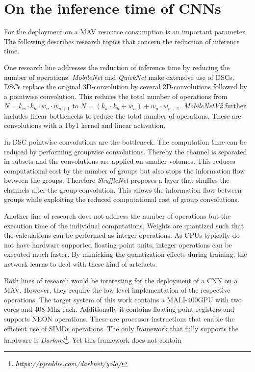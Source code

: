 \section{On the inference time of \acp{CNN}}

For the deployment on a \ac{MAV} resource consumption is an important parameter. The following describes research topics that concern the reduction of inference time.

One research line addresses the reduction of inference time by reducing the number of operations. \textit{MobileNet} \cite{Howard2017} and \textit{QuickNet} \cite{Ghosh2017} make extensive use of \acp{DSC}. \acp{DSC} replace the original 3D-convolution by several 2D-convolutions followed by a pointwise convolution. This reduces the total number of operations from $N = k_w \cdot k_h \cdot w_n \cdot w_{n+1}$ to $N=(k_w \cdot k_h + w_n)+w_n \cdot w_{n+1}$. \textit{MobileNetV2} \cite{Sandler2018} further includes linear bottlenecks to reduce the total number of operations. These are convolutions with a 1by1 kernel and linear activation.

In \ac{DSC} pointwise convolutions are the bottleneck. The computation time can be reduced by performing groupwise convolutions. Thereby the channel is separated in subsets and the convolutions are applied on smaller volumes. This reduces computational cost by the number of groups but also stops the information flow between the groups. Therefore \textit{ShuffleNet}\cite{Zhang2017a} proposes a layer that shuffles the channels after the group convolution. This allows the information flow between groups while exploiting the reduced computational cost of group convolutions.

Another line of research does not address the number of operations but the execution time of the individual computations. Weights are quantized such that the calculations can be performed as integer operations. As \acp{CPU} typically do not have hardware supported floating point units, integer operations can be executed much faster. By mimicking the quantization effects during training, the network learns to deal with these kind of artefacts. 

Both lines of research would be interesting for the deployment of a \ac{CNN} on a \ac{MAV}. However, they require the low level implementation of the respective operations. The target system of this work contains a MALI-400GPU with two cores and 408 Mhz each. Additionally it contains floating point registers and supports NEON operations. These are processor instructions that enable the efficient use of \acp{SIMD} operations. The only framework that fully supports the hardware is \textit{Darknet}\footnote{\textit{https://pjreddie.com/darknet/yolo/}}. Yet this framework does not contain 

